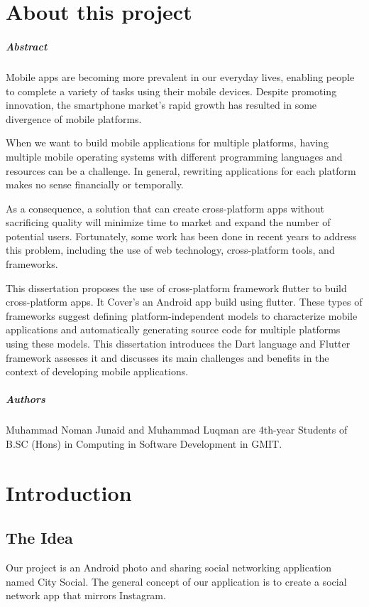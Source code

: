 
\chapter*{About this project}
\paragraph{Abstract}
Mobile apps are becoming more prevalent in our everyday lives, enabling people to complete a variety of tasks using their mobile devices. Despite promoting innovation, the smartphone market's rapid growth has resulted in some divergence of mobile platforms.

When we want to build mobile applications for multiple platforms, having multiple mobile operating systems with different programming languages and resources can be a challenge. In general, rewriting applications for each platform makes no sense financially or temporally.

As a consequence, a solution that can create cross-platform apps without sacrificing quality will minimize time to market and expand the number of potential users. Fortunately, some work has been done in recent years to address this problem, including the use of web technology, cross-platform tools, and frameworks.

This dissertation proposes the use of cross-platform framework flutter to build cross-platform apps. It Cover's an  Android app build using flutter. These types of frameworks suggest defining platform-independent models to characterize mobile applications and automatically generating source code for multiple platforms using these models.
This dissertation introduces the Dart language and Flutter framework assesses it and discusses its main challenges and benefits in the context of developing mobile applications.

\paragraph{Authors}
Muhammad Noman Junaid and Muhammad Luqman are 4th-year Students of B.SC (Hons) in Computing in Software Development in GMIT.



\chapter{Introduction}
\section{The Idea}
Our project is an Android photo and sharing social networking application named City Social. The general concept of our application is to create a social network app that mirrors Instagram.

